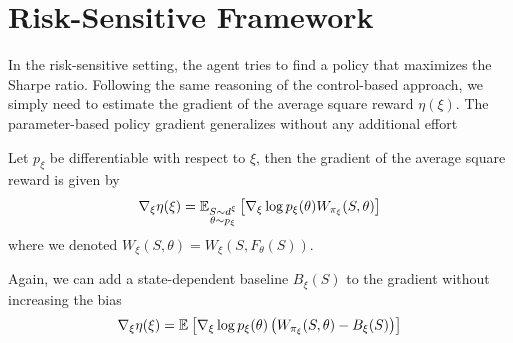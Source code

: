 \section{Risk-Sensitive Framework}
In the risk-sensitive setting, the agent tries to find a policy that maximizes the Sharpe ratio. Following the same reasoning of the control-based approach, we simply need to estimate the gradient of the average square reward $\eta(\xi)$. The parameter-based policy gradient generalizes without any additional effort
\begin{theorem}
	Let $p_\xi$ be differentiable with respect to $\xi$, then the gradient of the average square reward is given by
	\begin{equation}
		\nabla_\xi \eta(\xi) = \E[\substack{S \sim d^\xi\\\theta \sim p_\xi}]{\nabla_\xi \log p_\xi(\theta) W_{\pi_\xi}(S, \theta)}
	\end{equation}
	where we denoted $W_\xi(S, \theta) = W_\xi(S, F_\theta(S))$.
\end{theorem}
Again, we can add a state-dependent baseline $B_\xi(S)$ to the gradient without increasing the bias
\begin{equation}
	\nabla_\xi \eta(\xi) = \E{\nabla_\xi \log p_\xi(\theta) \left(W_{\pi_\xi}(S,
						\theta) - B_\xi(S)\right)}
\end{equation}


